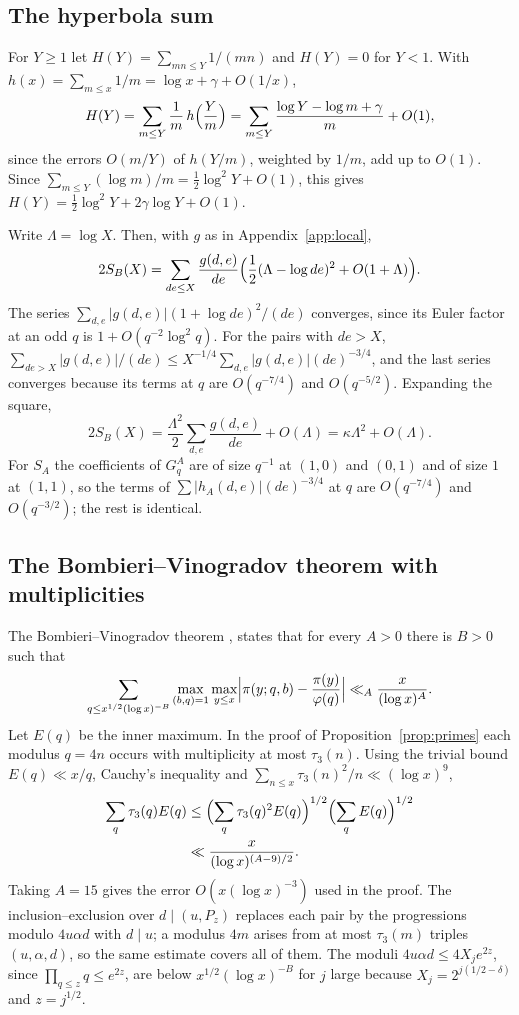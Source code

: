 \documentclass[aps,prd,twocolumn,superscriptaddress,nofootinbib,longbibliography,floatfix,showkeys,nobalancelastpage,amsmath,amssymb,10pt]{revtex4-2}
\theoremstyle{plain}
\theoremstyle{definition}
\theoremstyle{plain}
\begin{document}
\subsection{The hyperbola sum}\label{app:hyperbola}

For $Y\ge1$ let $H(Y)=\sum_{mn\le Y}1/(mn)$ and $H(Y)=0$ for $Y<1$. With $h(x)=\sum_{m\le x}1/m=\log x+\gamma+O(1/x)$,
\[
H(Y)=\sum_{m\le Y}\frac1m\,h\Bigl(\frac Ym\Bigr)=\sum_{m\le Y}\frac{\log Y-\log m+\gamma}m+O(1),
\]
since the errors $O(m/Y)$ of $h(Y/m)$, weighted by $1/m$, add up to $O(1)$. Since $\sum_{m\le Y}(\log m)/m=\frac12\log^2Y+O(1)$, this gives $H(Y)=\frac12\log^2Y+2\gamma\log Y+O(1)$.

Write $\Lambda=\log X$. Then, with $g$ as in Appendix~\ref{app:local},
\[
2S_B(X)=\sum_{de\le X}\frac{g(d,e)}{de}\Bigl(\frac12(\Lambda-\log de)^2+O(1+\Lambda)\Bigr).
\]
The series $\sum_{d,e}|g(d,e)|(1+\log de)^2/(de)$ converges, since its Euler factor at an odd $q$ is $1+O(q^{-2}\log^2q)$. For the pairs with $de>X$, $\sum_{de>X}|g(d,e)|/(de)\le X^{-1/4}\sum_{d,e}|g(d,e)|(de)^{-3/4}$, and the last series converges because its terms at $q$ are $O(q^{-7/4})$ and $O(q^{-5/2})$. Expanding the square,
\[
2S_B(X)=\frac{\Lambda^2}2\sum_{d,e}\frac{g(d,e)}{de}+O(\Lambda)=\kappa\Lambda^2+O(\Lambda).
\]
For $S_A$ the coefficients of $G^A_q$ are of size $q^{-1}$ at $(1,0)$ and $(0,1)$ and of size $1$ at $(1,1)$, so the terms of $\sum|h_A(d,e)|(de)^{-3/4}$ at $q$ are $O(q^{-7/4})$ and $O(q^{-3/2})$; the rest is identical.

\subsection{The Bombieri--Vinogradov theorem with multiplicities}\label{app:bv}

The Bombieri--Vinogradov theorem \cite{Bom}, \cite[Chapter~28]{Dav} states that for every $A>0$ there is $B>0$ such that
\[
\sum_{q\le x^{1/2}(\log x)^{-B}}\max_{(b,q)=1}\max_{y\le x}\Bigl|\pi(y;q,b)-\frac{\pi(y)}{\varphi(q)}\Bigr|\ll_A\frac x{(\log x)^A}.
\]
Let $E(q)$ be the inner maximum. In the proof of Proposition~\ref{prop:primes} each modulus $q=4n$ occurs with multiplicity at most $\tau_3(n)$. Using the trivial bound $E(q)\ll x/q$, Cauchy's inequality and $\sum_{n\le x}\tau_3(n)^2/n\ll(\log x)^9$,
\begin{align*}
\sum_q\tau_3(q)E(q)&\le\Bigl(\sum_q\tau_3(q)^2E(q)\Bigr)^{1/2}\Bigl(\sum_qE(q)\Bigr)^{1/2}\\
&\ll\frac{x}{(\log x)^{(A-9)/2}}.
\end{align*}
Taking $A=15$ gives the error $O(x(\log x)^{-3})$ used in the proof. The inclusion--exclusion over $d\mid(u,P_z)$ replaces each pair by the progressions modulo $4u\alpha d$ with $d\mid u$; a modulus $4m$ arises from at most $\tau_3(m)$ triples $(u,\alpha,d)$, so the same estimate covers all of them. The moduli $4u\alpha d\le4X_je^{2z}$, since $\prod_{q\le z}q\le e^{2z}$, are below $x^{1/2}(\log x)^{-B}$ for $j$ large because $X_j=2^{j(1/2-\delta)}$ and $z=j^{1/2}$.
\end{document}
